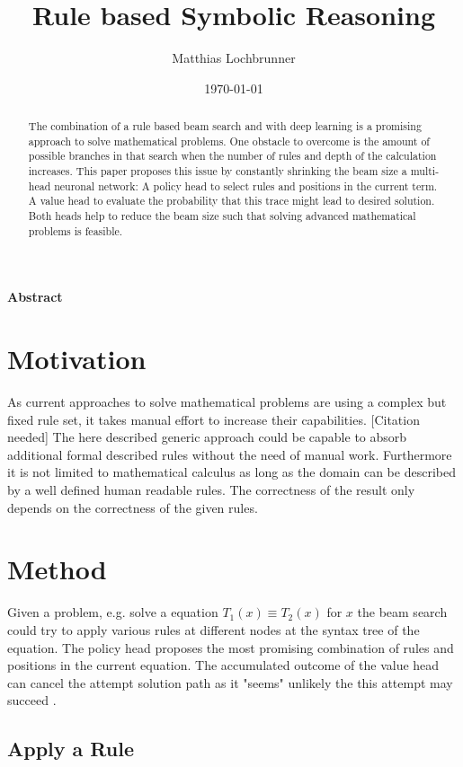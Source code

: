 \documentclass{scrartcl}
\title{Rule based Symbolic Reasoning}
\author{Matthias Lochbrunner}
\date{\today}
\theoremstyle{definition}
\begin{document}
\maketitle
\begin{center}
	\textbf{Abstract}
\end{center}
\begin{abstract}
	The combination of a rule based beam search and with deep learning is a promising approach to solve mathematical problems.
	One obstacle to overcome is the amount of possible branches in that search when the number of rules and depth of the calculation increases.
	This paper proposes this issue by constantly shrinking the beam size a multi-head neuronal network:
	A policy head to select rules and positions in the current term. A value head to evaluate the probability that this trace might lead to desired solution.
	Both heads help to reduce the beam size such that solving advanced mathematical problems is feasible.
\end{abstract}

\section{Motivation}

As current approaches to solve mathematical problems are using a complex but fixed rule set, it takes manual effort to increase their capabilities. [Citation needed]
The here described generic approach could be capable to absorb additional formal described rules without the need of manual work.
Furthermore it is not limited to mathematical calculus as long as the domain can be described by a well defined human readable rules.
The correctness of the result only depends on the correctness of the given rules.

\section{Method}

Given a problem, e.g. solve a equation $T_1\left(x\right)\equiv T_2\left(x\right)$ for $x$ the beam search could try to apply various rules at different nodes at the syntax tree of the equation.
The policy head proposes the most promising combination of rules and positions in the current equation.
The accumulated outcome of the value head can cancel the attempt solution path as it "seems" unlikely the this attempt may succeed \cite{44806}.

\subsection{Apply a Rule}
\end{document}
